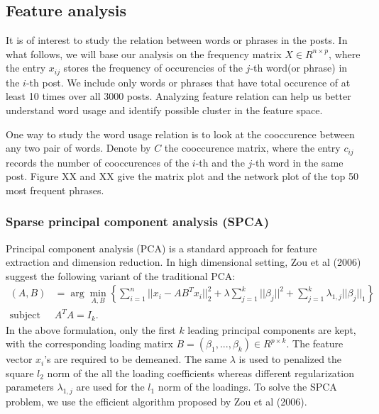 \documentclass[11pt]{article}
\newcommand{\1}[1]{{\mathbf 1}\left\{#1\right\}}        %
\begin{document}
\subsection{Feature analysis}
It is of interest to study the relation between words or phrases in the posts. In what follows, we will base our analysis on the frequency matrix $X\in R^{n\times p}$, where the entry $x_{ij}$ stores the frequency of occurencies of the $j$-th word(or phrase) in the $i$-th post. We include only words or phrases that have total occurence of at least 10 times over all 3000 posts. Analyzing feature relation can help us better understand word usage and identify possible cluster in the feature space. 

%

One way to study the word usage relation is to look at the cooccurence between any two pair of words. Denote by $C$ the cooccurence matrix, where the entry $c_{ij}$ records the number of cooccurences of the $i$-th and the $j$-th word in the same post. Figure XX and XX give the matrix plot and the network plot of the top 50 most frequent phrases. 



\subsubsection{Sparse principal component analysis (SPCA)}
Principal component analysis (PCA) is a standard approach for feature extraction and dimension reduction. In high dimensional setting, Zou et al (2006) \cite{ZouSpca} suggest the following variant of the traditional PCA:
\begin{align}
(A,B) & = \arg \min_{A,B} \left \{ \sum_{i=1}^n||x_i-AB^Tx_i||_2^2 + \lambda \sum_{j=1}^k||\beta_j||^2 + \sum_{j=1}^k\lambda_{1,j}||\beta_j||_1 \right\} \\ 
\text{subject to } & A^TA = I_{k}. \nonumber
\end{align}
In the above formulation, only the first $k$ leading principal components are kept, with the corresponding loading matirx $B = (\beta_1,...,\beta_k) \in R^{p\times k}$. The feature vector $x_i$'s are required to be demeaned. The same $\lambda$ is used to penalized the square $l_2$ norm of the all the loading coefficients whereas different regularization parameters $\lambda_{1,j}$ are used for the $l_1$ norm of the loadings. To solve the SPCA problem, we use the efficient algorithm proposed by Zou et al (2006). 
\end{document}
